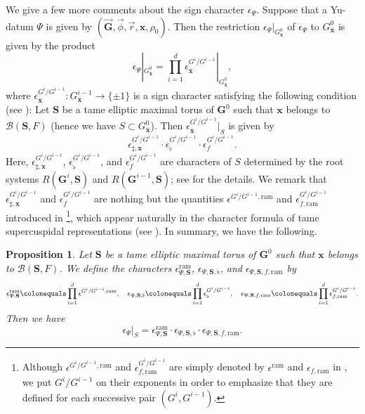\documentclass{amsart}
\newcommand{\ram}{\mathrm{ram}}
\newcommand{\x}{\mathbf{x}}
\newcommand{\bfG}{\mathbf{G}}
\newcommand{\bfS}{\mathbf{S}}
\newcommand{\mcB}{\mathcal{B}}
\theoremstyle{plain}
\newtheorem{prop}[thm]{Proposition}
\theoremstyle{definition}
\theoremstyle{remark}
\theoremstyle{theorem}
\begin{document}
We give a few more comments about the sign character $\epsilon_{\Psi}$.
Suppose that a Yu-datum $\Psi$ is given by $(\vec{\bfG},\vec{\phi},\vec{r},\x,\rho_{0})$.
Then the restriction $\epsilon_{\Psi}|_{G^{0}_{\bar{\x}}}$ of $\epsilon_{\Psi}$ to $G^{0}_{\bar{\x}}$ is given by the product
\[
\epsilon_{\Psi}|_{G^{0}_{\bar{\x}}}
=\prod_{i=1}^{d}\epsilon_{\bar{\x}}^{G^{i}/G^{i-1}}|_{G^{0}_{\bar{\x}}},
\]
where $\epsilon_{\bar{\x}}^{G^{i}/G^{i-1}}\colon G^{i-1}_{\bar{\x}}\rightarrow\{\pm1\}$ is a sign character satisfying the following condition (see \cite[Theorem 3.4 and Lemma 3.5]{FKS21}):
Let $\bfS$ be a tame elliptic maximal torus of $\bfG^{0}$ such that $\x$ belongs to $\mcB(\bfS,F)$ (hence we have $S\subset G^{0}_{\bar{\x}}$).
Then $\epsilon_{\bar{\x}}^{G^{i}/G^{i-1}}|_{S}$ is given by
\[
\epsilon_{\sharp,\x}^{G^{i}/G^{i-1}}
\cdot\epsilon_{\flat}^{G^{i}/G^{i-1}}
\cdot\epsilon_{f}^{G^{i}/G^{i-1}}.
\]
Here, $\epsilon_{\sharp,\x}^{G^{i}/G^{i-1}}$, $\epsilon_{\flat}^{G^{i}/G^{i-1}}$, and $\epsilon_{f}^{G^{i}/G^{i-1}}$ are characters of $S$ determined by the root systems $R(\bfG^{i},\bfS)$ and $R(\bfG^{i-1},\bfS)$; see \cite[Definition 3.1]{FKS21} for the details.
We remark that $\epsilon_{\sharp,\x}^{G^{i}/G^{i-1}}$ and $\epsilon_{f}^{G^{i}/G^{i-1}}$ are nothing but the quantities $\epsilon^{G^{i}/G^{i-1},\ram}$ and $\epsilon_{f,\ram}^{G^{i}/G^{i-1}}$ introduced in \cite{Kal19}\footnote{Although $\epsilon^{G^{i}/G^{i-1},\ram}$ and $\epsilon_{f,\ram}^{G^{i}/G^{i-1}}$ are simply denoted by $\epsilon^{\ram}$ and $\epsilon_{f,\ram}$ in \cite{Kal19}, we put $G^{i}/G^{i-1}$ on their exponents in order to emphasize that they are defined for each successive pair $(G^{i},G^{i-1})$.}, which appear naturally in the character formula of tame supercuspidal representations (see \cite[Remark 3.3]{FKS21}).
In summary, we have the following.
\begin{prop}\label{prop:epsilon}
Let $\bfS$ be a tame elliptic maximal torus of $\bfG^{0}$ such that $\x$ belongs to $\mcB(\bfS,F)$.
We define the characters $\epsilon^{\ram}_{\Psi,\bfS}$, $\epsilon_{\Psi,\bfS,\flat}$, and $\epsilon_{\Psi,\bfS,f,\ram}$ by
\[
\epsilon_{\Psi,\bfS}^{\ram}\colonequals \prod_{i=1}^{d}\epsilon^{G^{i}/G^{i-1},\ram},\quad
\epsilon_{\Psi,\bfS,\flat}\colonequals \prod_{i=1}^{d}\epsilon_{\flat}^{G^{i}/G^{i-1}},\quad
\epsilon_{\Psi,\bfS,f,\ram}\colonequals \prod_{i=1}^{d}\epsilon_{f,\ram}^{G^{i}/G^{i-1}}.
\]
Then we have 
\[
\epsilon_{\Psi}|_{S}
=
\epsilon_{\Psi,\bfS}^{\ram}
\cdot\epsilon_{\Psi,\bfS,\flat}
\cdot\epsilon_{\Psi,\bfS,f,\ram}.
\]
\end{prop}
\end{document}

